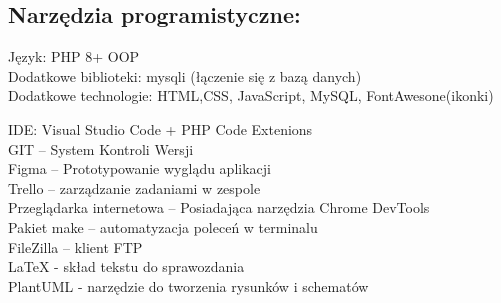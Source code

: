 \subsection{Narzędzia programistyczne:}
    \begin{flushleft}
        Język: PHP 8+ OOP \\
        Dodatkowe biblioteki: mysqli (łączenie się z bazą danych)\\
        Dodatkowe technologie: HTML,CSS, JavaScript, MySQL, FontAwesone(ikonki) \newline\newline

        IDE: Visual Studio Code + PHP Code Extenions\\
        GIT – System Kontroli Wersji\\
        Figma – Prototypowanie wyglądu aplikacji \\
        Trello – zarządzanie zadaniami w zespole\\
        Przeglądarka internetowa – Posiadająca narzędzia Chrome DevTools \\
        Pakiet make – automatyzacja poleceń w terminalu\\
        FileZilla – klient FTP\\
        LaTeX - skład tekstu do sprawozdania\\
        PlantUML - narzędzie do tworzenia rysunków i schematów\\

    \end{flushleft}
    \pagebreak

